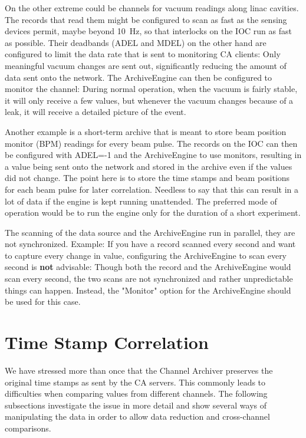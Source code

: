 On the other extreme could be channels for vacuum readings along linac
cavities. The records that read them might be configured to scan as
fast as the sensing devices permit, maybe beyond 10~Hz, so that
interlocks on the IOC run as fast as possible. Their deadbands (ADEL
and MDEL) on the other hand are configured to limit the data rate that
is sent to monitoring CA clients: Only meaningful vacuum changes are
sent out, significantly reducing the amount of data sent onto the
network.  The ArchiveEngine can then be configured to monitor the
channel: During normal operation, when the vacuum is fairly stable, it
will only receive a few values, but whenever the vacuum changes
because of a leak, it will receive a detailed picture of the event.

Another example is a short-term archive that is meant to store
beam position monitor (BPM) readings for every beam pulse. The records
on the IOC can then be configured with ADEL=-1 and the ArchiveEngine
to use monitors, resulting in a value being sent onto the network and
stored in the archive even if the values did not change. The point
here is to store the time stamps and beam positions for each beam
pulse for later correlation. Needless to say that this can result in a
lot of data if the engine is kept running unattended. The preferred
mode of operation would be to run the engine only for the duration
of a short experiment.

\NOTE The scanning of the data source and the ArchiveEngine run in
parallel, they are not synchronized.
Example: If you have a record scanned every second and want to capture
every change in value, configuring the ArchiveEngine to scan every
second is {\bfseries not} advisable:
Though both the record and the ArchiveEngine would scan every
second, the two scans are not synchronized and rather unpredictable
things can happen. Instead, the "Monitor" option for the ArchiveEngine
should be used for this case.

\section{Time Stamp Correlation} 
\label{sec:timestampcorr}
We have stressed more than once that the Channel Archiver preserves
the original time stamps as sent by the CA servers.  This commonly
leads to difficulties when comparing values from different
channels. The following subsections investigate the issue in more
detail and show several ways of manipulating the data in order to
allow data reduction and cross-channel comparisons.

